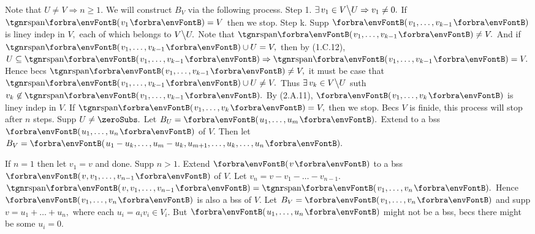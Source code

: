 \TextB{\vspace{0pt}}
Note that $U\neq V\Rightarrow n\geqslant 1.$ We will construct $B_V$ via the following process.\TextB{}
{\tgbfx Step 1.} $\exists\,v_1\in V\big\backslash U\Rightarrow v_1\neq 0.$ If $\Span{v_1}=V$ then we stop.\TextB{}
{\tgbfx Step k.} Supp $\Par{v_1,\dots,v_{k-1}}$ is liney indep in $V,$ each of which belongs to $V\big\backslash U.$\TextB{}
 Note that $\Span{v_1,\dots,v_{k-1}}\neq V.$ And if $\Span{v_1,\dots,v_{k-1}}\cup U=V,$ then by (1.C.12),\TextB{}
  $U\subseteq \Span{v_1,\dots,v_{k-1}}\Rightarrow\Span{v_1,\dots,v_{k-1}}=V.$\TextB{}
 Hence becs $\Span{v_1,\dots,v_{k-1}}\neq V,$ it must be case that $\Span{v_1,\dots,v_{k-1}}\cup U\neq V.$\TextB{}
 Thus $\exists\,v_k\in V\big\backslash U$ suth $v_k\not\in\Span{v_1,\dots,v_{k-1}}.$\TextB{}
 By (2.A.11), $\Par{v_1,\dots,v_k}$ is liney indep in $V$. If $\Span{v_1,\dots,v_k}=V,$ then we stop.\TextB{}
Becs $V$ is finide, this process will stop after $n$ steps.\PfEnd\vspace{4pt}\TextB{}
\Or Supp $U\neq\zeroSubs.$ Let $B_U=\Par{u_1,\dots,u_m}.$ Extend to a bss $\Par{u_1,\dots,u_n}$ of $V.$\TextB{}
\Blind{\Or}Then let $B_V=\Par{u_1-u_k,\dots,u_m-u_k,u_{m+1},\dots,u_k,\dots,u_n}.$\PfEnd
\SepLine\ChEnd
\pagebreak


\vspace{4pt}



If $n=1$ then let $v_1=v$ and done. Supp $n>1.$\parSol{}
Extend $\Par{v}$ to a bss $\Par{v,v_1,\dots,v_{n-1}}$ of $V.$ Let $v_n=v-v_1-\dots-v_{n-1}.$\parSol{}
\又 $\Span{v,v_1,\dots,v_{n-1}}=\Span{v_1,\dots,v_n}.$ Hence $\Par{v_1,\dots,v_n}$ is also a bss of $V.$\PfEnd\vspace{4pt}
\AComm Let $B_V=\Par{v_1,\dots,v_n}$ and supp $v=u_1+\dots+u_n,$ where each $u_i=a_i v_i\in V_{\!i}.$\parCom
But $\Par{u_1,\dots,u_n}$ might not be a bss, becs there might be some $u_i=0.$\vspace{-2pt}
\SepLine

